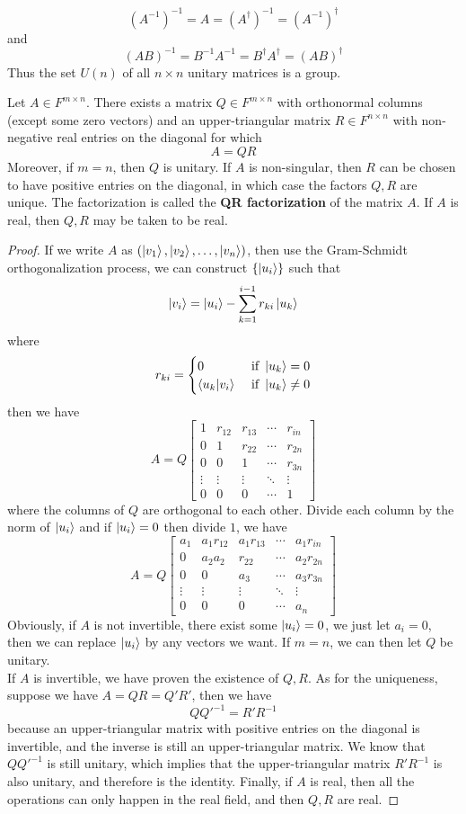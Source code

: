 \documentclass{article}
\begin{document}
\[(A^{-1})^{-1}=A=(A^\dagger)^{-1}=(A^{-1})^\dagger\]
and
\[(AB)^{-1}=B^{-1}A^{-1}=B^\dagger A^\dagger=(AB)^\dagger\]
Thus the set $U(n)$ of all $n\times n$ unitary matrices is a group.
\begin{thm}
	Let $A\in F^{m\times n}$. There exists a matrix $Q\in F^{m\times n}$ with orthonormal columns (except some zero vectors) and an upper-triangular matrix $R\in F^{n\times n}$ with non-negative real entries on the diagonal for which
	\[A=QR\]
	Moreover, if $m=n$, then $Q$ is unitary. If $A$ is non-singular, then $R$ can be chosen to have positive entries on the diagonal, in which case the factors $Q,R$ are unique. The factorization is called the \textbf{QR factorization} of the matrix $A$. If $A$ is real, then $Q,R$ may be taken to be real. 
\end{thm}
\begin{proof}
	If we write $A$ as $(\ket{v_1},\ket{v_2},\dots,\ket{v_n})$, then use the Gram-Schmidt orthogonalization process, we can construct $\{\ket{u_i}\}$ such that
	\[\ket{v_i}=\ket{u_i}-\sum_{k=1}^{i-1}r_{ki}\ket{u_k}\]
	where
	\[r_{ki}=\begin{cases}
		0&\text{ if }\ket{u_k}=0\\
		\braket{u_k|v_i}&\text{ if }\ket{u_k}\neq0
	\end{cases}\]
	then we have
	\[A=Q\begin{bmatrix}
		1&r_{12}&r_{13}&\cdots&r_{in}\\
		0&1&r_{22}&\cdots&r_{2n}\\
		0&0&1&\cdots&r_{3n}\\
		\vdots&\vdots&\vdots&\ddots&\vdots\\
		0&0&0&\cdots&1
	\end{bmatrix}\]
	where the columns of $Q$ are orthogonal to each other. Divide each column by the norm of $\ket{u_i}$ and if $\ket{u_i}=0$ then divide $1$, we have
	\[A=Q\begin{bmatrix}
		a_1&a_1r_{12}&a_1r_{13}&\cdots&a_1r_{in}\\
		0&a_2a_2&r_{22}&\cdots&a_2r_{2n}\\
		0&0&a_3&\cdots&a_3r_{3n}\\
		\vdots&\vdots&\vdots&\ddots&\vdots\\
		0&0&0&\cdots&a_n
	\end{bmatrix}\]
	Obviously, if $A$ is not invertible, there exist some $\ket{u_i}=0$, we just let $a_i=0$, then we can replace $\ket{u_i}$ by any vectors we want. If $m=n$, we can then let $Q$ be unitary.\\
	If $A$ is invertible, we have proven the existence of $Q,R$. As for the uniqueness, suppose we have $A=QR=Q'R'$, then we have
	\[QQ'^{-1}=R'R^{-1}\]
	because an upper-triangular matrix with positive entries on the diagonal is invertible, and the inverse is still an upper-triangular matrix. We know that $QQ'^{-1}$ is still unitary, which implies that the upper-triangular matrix $R'R^{-1}$ is also unitary, and therefore is the identity. Finally, if $A$ is real, then all the operations can only happen in the real field, and then $Q,R$ are real.
\end{proof}
\end{document}
